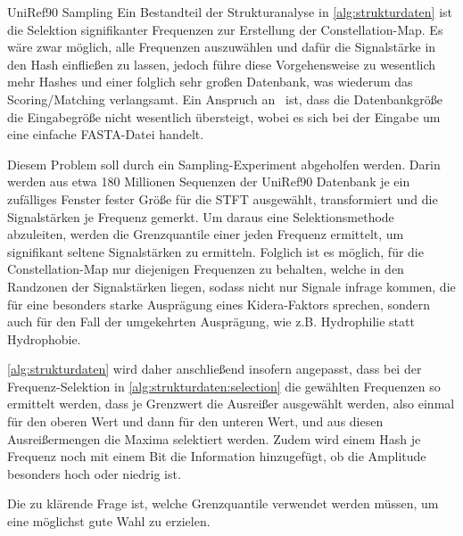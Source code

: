     \begin{experiment}{UniRef90 Sampling} %
        \label{exp:uniref90}
        Ein Bestandteil der Strukturanalyse in \autoref{alg:strukturdaten} ist die Selektion signifikanter Frequenzen zur Erstellung der Constellation-Map. Es wäre zwar möglich, alle Frequenzen auszuwählen und dafür die Signalstärke in den Hash einfließen zu lassen, jedoch führe diese Vorgehensweise zu wesentlich mehr Hashes und einer folglich sehr großen Datenbank, was wiederum das Scoring/Matching verlangsamt. Ein Anspruch an \protfin\ ist, dass die Datenbankgröße die Eingabegröße nicht wesentlich übersteigt, wobei es sich bei der Eingabe um eine einfache FASTA-Datei handelt.

        Diesem Problem soll durch ein Sampling-Experiment abgeholfen werden. Darin werden aus etwa 180 Millionen Sequenzen der UniRef90 Datenbank je ein zufälliges Fenster fester Größe für die \ac{STFT} ausgewählt, transformiert und die Signalstärken je Frequenz gemerkt. Um daraus eine Selektionsmethode abzuleiten, werden die Grenzquantile einer jeden Frequenz ermittelt, um signifikant seltene Signalstärken zu ermitteln. Folglich ist es möglich, für die Constellation-Map nur diejenigen Frequenzen zu behalten, welche in den Randzonen der Signalstärken liegen, sodass nicht nur Signale infrage kommen, die für eine besonders starke Ausprägung eines Kidera-Faktors sprechen, sondern auch für den Fall der umgekehrten Ausprägung, wie z.B. Hydrophilie statt Hydrophobie.

        \autoref{alg:strukturdaten} wird daher anschließend insofern angepasst, dass bei der Frequenz-Selektion in \autoref{alg:strukturdaten:selection} die gewählten Frequenzen so ermittelt werden, dass je Grenzwert die Ausreißer ausgewählt werden, also einmal für den oberen Wert und dann für den unteren Wert, und aus diesen Ausreißermengen die Maxima selektiert werden. Zudem wird einem Hash je Frequenz noch mit einem Bit die Information hinzugefügt, ob die Amplitude besonders hoch oder niedrig ist.

        Die zu klärende Frage ist, welche Grenzquantile verwendet werden müssen, um eine möglichst gute Wahl zu erzielen.
    \end{experiment}
